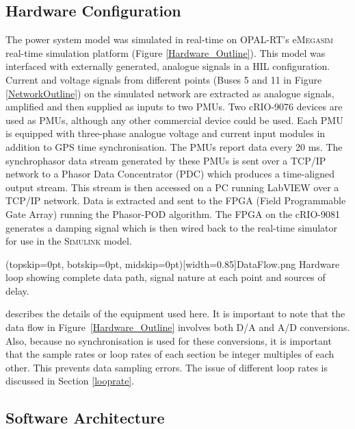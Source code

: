 \documentclass{ieeeaccess}
\begin{document}
\subsection{Hardware Configuration}
The power system model was simulated in real-time on OPAL-RT's e\textsc{Megasim} \cite{eMEGASIM} real-time simulation platform (Figure \ref {Hardware_Outline}). This model was interfaced with externally generated, analogue signals in a HIL configuration. Current and voltage signals from different points (Buses 5 and 11 in Figure \ref{NetworkOutline}) on the simulated network are extracted as analogue signals, amplified and then supplied as inputs to two PMUs. Two cRIO-9076 \cite{cRIO9081} devices are used as PMUs, although any other commercial device could be used. Each PMU is equipped with three-phase analogue voltage and current input modules in addition to GPS time synchronisation. The PMUs report data every 20 ms. The synchrophasor data stream  generated by these PMUs is sent over a TCP/IP network to a Phasor Data Concentrator (PDC) which produces a time-aligned output stream. This stream is then accessed on a PC running LabVIEW over a TCP/IP network. Data is extracted and sent to the FPGA (Field Programmable Gate Array) running the Phasor-POD algorithm. The FPGA on the cRIO-9081 \cite{cRIO9081} generates a damping signal which is then wired back to the real-time simulator for use in the \textsc{Simulink} model.


\Figure[tbph](topskip=0pt, botskip=0pt, midskip=0pt)[width=0.85\textwidth]{DataFlow.png}
{Hardware loop showing complete data path, signal nature at each point and sources of delay.\label{Hardware_Outline}}


\cite{PhasorPODImplement} describes the details of the equipment used here. It is important to note that the data flow in Figure~\ref{Hardware_Outline} involves both D/A and A/D conversions. Also, because no synchronisation is used for these conversions, it is important that the sample rates or loop rates of each section be integer multiples of each other. This prevents data sampling errors. The issue of different loop rates is discussed in Section \ref{looprate}.

\subsection{Software Architecture}
\end{document}
